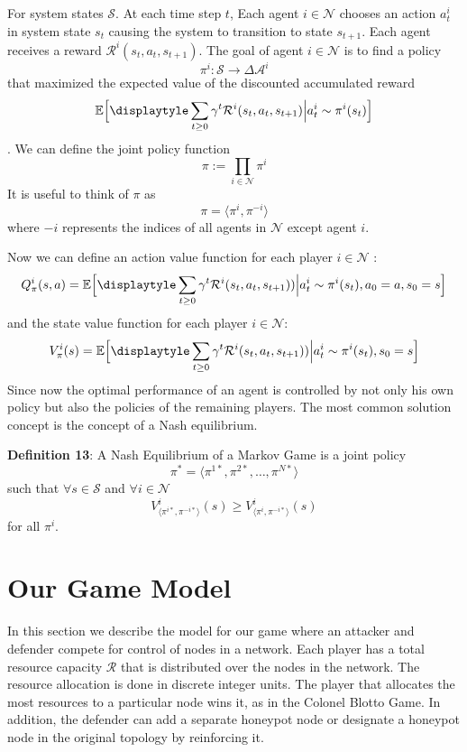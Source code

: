 \documentclass[conference]{IEEEtran}
\begin{document}
For  system states $\mathcal{S}$. At each time step $t$, Each agent $i \in \mathcal{N}$ chooses an action $a^i_t$ in system state $s_t$ causing the system to transition to state $s_{t+1}$. Each agent receives a reward $\mathcal{R}^i(s_t, a_t, s_{t+1})$. The goal of agent $i\in\mathcal{N}$ is to find a policy $$\pi^i \mathpunct{:} \mathcal{S} \to \Delta \mathcal{A}^i$$ that maximized the expected value of the discounted accumulated reward $$\mathbb{E}\Big[\displaytyle\sum_{t\geq 0}\gamma^t\mathcal{R}^i(s_t, a_t, s_{t+1})\Big| a^i_t \sim \pi^i(s_t)\Big]$$. We can define the joint policy function $$\pi \mathpunct{:=} \prod_{i\in \mathcal{N}}\pi^i$$ It is useful to think of $\pi$ as $$\pi = \langle \pi^i, \pi^{-i} \rangle$$ where $−i$ represents the indices of all agents in $\mathcal{N}$ except agent $i$.

\par Now we can define an action value function for each player $i \in \mathcal{N}$ : $$Q^i_{\pi}(s, a) = \mathbb{E}\Big[\displaytyle\sum_{t\geq 0}\gamma^t\mathcal{R}^i(s_t, a_t, s_{t+1}))\Big| a^i_t \sim \pi^i(s_t), a_0 = a, s_0 = s\Big]$$ and the state value function for each player $i \in \mathcal{N}$:
$$V^i_{\pi}(s) = \mathbb{E}\Big[\displaytyle\sum_{t\geq 0}\gamma^t\mathcal{R}^i(s_t, a_t, s_{t+1}))\Big| a^i_t \sim \pi^i(s_t), s_0 = s\Big]$$ 
Since now the optimal performance of an agent is controlled by not only his own policy but also the policies of the remaining players. The most common solution concept is the concept of a Nash equilibrium.

\textbf{Definition 13}: A Nash Equilibrium of a Markov Game is a joint policy $$ \pi^* = \langle \pi^{1*}, \pi^{2*}, \ldots, \pi^{N*} \rangle $$ such that $\forall s \in \mathcal{S}$ and $\forall i \in \mathcal{N}$ $$V^i_{\langle \pi^{i*}, \pi^{-i*} \rangle}(s) \geq V^i_{\langle \pi^{i}, \pi^{-i*} \rangle}(s)$$ for all $\pi^i$.

\section{Our Game Model}

In this section we describe the model for our game where an attacker and defender compete for control of nodes in a network. Each player has a total resource capacity $\mathcal{R}$ that is distributed over the nodes in the network. The resource allocation is done in discrete integer units. The player that allocates the most resources to a particular node wins it, as in the Colonel Blotto Game. In addition, the defender can add a separate honeypot node or designate a honeypot node in the original topology by reinforcing it.
\end{document}

